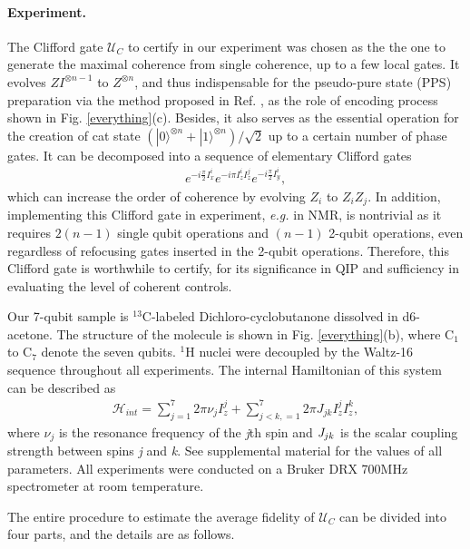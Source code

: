 \documentclass[prl,twocolumn,showpacs]{revtex4-1}
\newcommand{\ket}[1]{|#1\rangle}
\begin{document}
\paragraph*{Experiment.}
The Clifford gate $\mathcal{U}_{C}$ to certify in our experiment was chosen as the the one to generate the maximal coherence from single coherence, up to a few local gates. It evolves $ZI^{\otimes n-1}$ to $Z^{\otimes n}$, and thus indispensable for the pseudo-pure state (PPS) preparation via the method proposed in Ref. \cite{Knill2000}, as the role of encoding process shown in Fig. \ref{everything}(c). Besides, it also serves as the essential operation for the creation of cat state $\left( \ket{0}^{\otimes n}+\ket{1}^{\otimes n} \right)/\sqrt{2}$ up to a certain number of phase gates. It can be decomposed into a sequence of elementary Clifford gates
\begin{align} \label{decomp}
e^{-i\frac{\pi}{2}I_x^i}e^{-i\pi I_z^i I_z^j} e^{-i\frac{\pi}{2}I_y^i},
\end{align}
which can increase the order of coherence by evolving $Z_i$ to $Z_i Z_j$. In addition, implementing this Clifford gate in experiment, \emph{e.g.} in NMR, is nontrivial as it requires $2(n-1)$ single qubit operations and $(n-1)$ 2-qubit operations, even regardless of refocusing gates inserted in the 2-qubit operations. Therefore, this Clifford gate is worthwhile to certify, for its significance in QIP and sufficiency in evaluating the level of coherent controls.

Our 7-qubit sample is $^{13}$C-labeled Dichloro-cyclobutanone dissolved in d6-acetone. The structure of the molecule is shown in Fig. \ref{everything}(b), where C$_1$ to C$_7$ denote the seven qubits. $^1$H nuclei were decoupled by the Waltz-16 sequence throughout all experiments. The internal Hamiltonian of this system can be described as
\begin{align}\label{Hamiltonian}
\mathcal{H}_{int}=\sum\limits_{j=1}^7 {2\pi \nu _j } I_z^j  + \sum\limits_{j < k,=1}^7 {2\pi} J_{jk} I_z^j I_z^k,
\end{align}
where $\nu_j$ is the resonance frequency of the \emph{j}th spin and $\emph{J}_{jk}$ is the scalar coupling strength between spins \emph{j} and \emph{k}. See supplemental material for the values of all parameters. All experiments were conducted on a Bruker DRX 700MHz spectrometer at room temperature.

The entire procedure to estimate the average fidelity of $\mathcal{U}_{C}$ can be divided into four parts, and the details are as follows.
\end{document}
